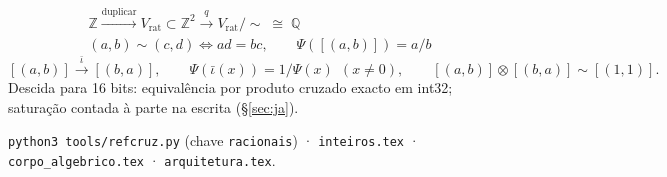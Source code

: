 \documentclass[11pt,a4paper]{article}
\newcommand{\code}[1]{\texttt{\small #1}}
\begin{document}
\[
\boxed{
\begin{array}{c}
\mathbb{Z}\xrightarrow{\text{duplicar}}V_{\mathrm{rat}}\subset\mathbb{Z}^{2}
\xrightarrow{\;q\;} V_{\mathrm{rat}}/{\sim}\;\cong\;\mathbb{Q}\\[2pt]
(a,b)\sim(c,d)\iff ad=bc,\qquad
\Psi([(a,b)])=a/b
\end{array}}
\]
\[
\boxed{
[(a,b)]\xrightarrow{\ \bar\iota\ }[(b,a)],\qquad
\Psi(\bar\iota(x))=1/\Psi(x)\ \ (x\neq 0),\qquad
[(a,b)]\otimes[(b,a)]\sim[(1,1)].
}
\]
Descida para 16 bits: equivalência por produto cruzado exacto em int32;
saturação contada à parte na escrita (\S\ref{sec:ja}).

\medskip\noindent
\code{python3 tools/refcruz.py} (chave \code{racionais}) ·
\code{inteiros.tex} · \code{corpo\_algebrico.tex} · \code{arquitetura.tex}.
\end{document}
